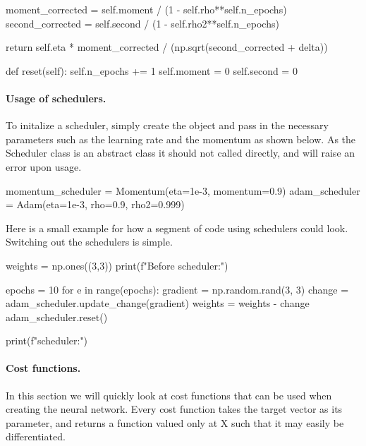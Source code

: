 \documentclass[%
oneside,                 %
final,                   %
10pt]{article}
\begin{document}
        moment_corrected = self.moment / (1 - self.rho**self.n_epochs)
        second_corrected = self.second / (1 - self.rho2**self.n_epochs)

        return self.eta * moment_corrected / (np.sqrt(second_corrected + delta))

    def reset(self):
        self.n_epochs += 1
        self.moment = 0
        self.second = 0


\epycod


\paragraph{Usage of schedulers.}
To initalize a scheduler, simply create the object and pass in the necessary parameters such as the learning rate and the momentum as shown below. As the Scheduler class is an abstract class it should not called directly, and will raise an error upon usage.




\bpycod
momentum_scheduler = Momentum(eta=1e-3, momentum=0.9)
adam_scheduler = Adam(eta=1e-3, rho=0.9, rho2=0.999)

\epycod


Here is a small example for how a segment of code using schedulers could look. Switching out the schedulers is simple.













\bpycod
weights = np.ones((3,3))
print(f"Before scheduler:")

epochs = 10
for e in range(epochs):
    gradient = np.random.rand(3, 3)
    change = adam_scheduler.update_change(gradient)
    weights = weights - change
    adam_scheduler.reset()

print(f"\nAfter scheduler:")

\epycod


\paragraph{Cost functions.}
In this section we will quickly look at cost functions that can be
used when creating the neural network. Every cost function takes the
target vector as its parameter, and returns a function valued only at
X such that it may easily be differentiated.
\end{document}

